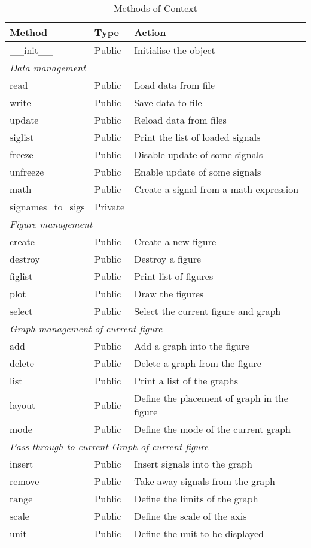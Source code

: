 \documentclass[a4paper,11pt]{article}
\begin{document}
\begin{table}[htbp]
  \centering\sf\small
  \begin{tabular}{lll}
    \hline
    Method & Type & Action \\
    \hline
    \_\_init\_\_ & Public & Initialise the object \\
    \multicolumn{3}{l}{\textit{Data management}} \\
    read & Public & Load data from file\\
    write &Public & Save data to file \\
    update & Public & Reload data from files\\
    siglist & Public & Print the list of loaded signals\\
    freeze & Public & Disable update of some signals\\
    unfreeze & Public & Enable update of some signals\\
    math & Public & Create a signal from a math expression\\
    signames\_to\_sigs & Private\\
    \multicolumn{3}{l}{\textit{Figure management}} \\
    create & Public & Create a new figure\\
    destroy & Public & Destroy a figure \\
    figlist & Public & Print list of figures \\
    plot & Public & Draw the figures\\    
    select & Public & Select the current figure and graph \\
    \multicolumn{3}{l}{\textit{Graph management of current figure}} \\
    add & Public & Add a graph into the figure \\
    delete & Public & Delete a graph from the figure \\
    list & Public & Print a list of the graphs\\
    layout & Public & Define the placement of graph in the figure\\
    mode & Public & Define the mode of the current graph\\
    \multicolumn{3}{l}{\textit{Pass-through to current Graph of current figure}} \\
    insert & Public & Insert signals into the graph\\
    remove & Public & Take away signals from the graph\\
    range & Public & Define the limits of the graph\\
    scale & Public & Define the scale of the axis\\
    unit & Public & Define the unit to be displayed\\
    \hline
  \end{tabular}
  \caption{Methods of Context}
  \label{tab:ctxt:meth}
\end{table}
\end{document}

